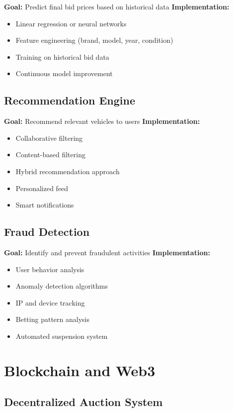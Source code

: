\textbf{Goal:} Predict final bid prices based on historical data
\textbf{Implementation:}
\begin{itemize}
    \item Linear regression or neural networks
    \item Feature engineering (brand, model, year, condition)
    \item Training on historical bid data
    \item Continuous model improvement
\end{itemize}

\subsection{Recommendation Engine}

\textbf{Goal:} Recommend relevant vehicles to users
\textbf{Implementation:}
\begin{itemize}
    \item Collaborative filtering
    \item Content-based filtering
    \item Hybrid recommendation approach
    \item Personalized feed
    \item Smart notifications
\end{itemize}

\subsection{Fraud Detection}

\textbf{Goal:} Identify and prevent fraudulent activities
\textbf{Implementation:}
\begin{itemize}
    \item User behavior analysis
    \item Anomaly detection algorithms
    \item IP and device tracking
    \item Betting pattern analysis
    \item Automated suspension system
\end{itemize}

\section{Blockchain and Web3}

\subsection{Decentralized Auction System}

